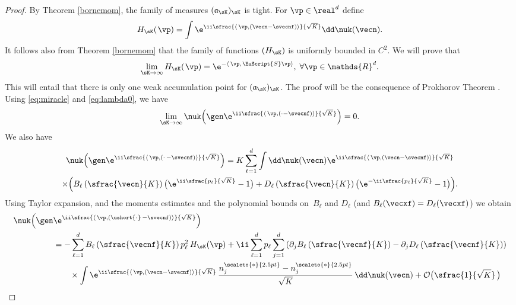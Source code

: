 \begin{proof}
By Theorem \ref{bornemom}, the family of measures $(\mathfrak{a}_{\sK})_{\sK}$ is tight.
For $\vp\in \real^d$ define
\[
H_{\sK}(\hspace{1pt}\vp)=\int \e^{\ii \sfrac{\langle\, \vp,(\vecn-\svecnf)\rangle}{\sqrt{K}}}\dd \nuk(\vecn).
\]
It follows also from Theorem \ref{bornemom} that the family of functions $(H_{\sK})$ is uniformly bounded in $C^{2}$.
We will prove that
\begin{equation}\label{pelouse}
\lim_{\sK\to\infty}H_{\sK}(\hspace{1pt}\vp)=\e^{-\langle\, \vp,\hspace{1pt}\EuScript{S}\vp\rangle},\;\forall \vp\in \mathds{R}^d.
\end{equation}
This will entail that there is only one weak accumulation point for $(\mathfrak{a}_{\sK})_{\sK}$.
The proof will be the consequence of Prokhorov Theorem \cite{patrick}.
Using \eqref{eq:miracle} and \eqref{eq:lambda0}, we have
\[
\lim_{\sK\to\infty}\nuk\!\left(\gen \e^{\ii\sfrac{\langle\, \vp,(\cdot-\svecnf)\rangle}{\sqrt{K}}}\right)=0.
\]
We also have
\begin{multline*}
\nuk\!\left(\gen \e^{\ii \sfrac{\langle\, \vp,(\cdot\,-\svecnf)\rangle}{\sqrt{K}}}\right)
=
K\sum_{\ell=1}^{d}\int\dd\nuk(\vecn)\e^{\ii\sfrac{\langle\, \vp,(\vecn-\svecnf)\rangle}{\sqrt{K}}} \\
\times \Bigl(B_{\ell}\left(\sfrac{\vecn}{K}\right) \bigl(\e^{\ii\sfrac{p_{\ell}}{\sqrt{K}}}-1 \bigr)
+ D_{\ell}\left(\sfrac{\vecn}{K}\right) \bigl(\e^{-\ii\sfrac{p_{\ell}}{\sqrt{K}}}-1 \bigr)\Bigr).
\end{multline*}
Using Taylor expansion, and the moments estimates and the polynomial bounds on~$B_{\ell}$ and $D_{\ell}$
(and $B_{\ell}(\vecxf)=D_{\ell}(\vecxf)$) we obtain
\begin{align*}
\nuk\Bigl(\gen& \e^{\ii\sfrac{\langle\, \vp,(\ushort{\cdot}\,-\svecnf)\rangle}{\sqrt{K}}}\Bigr)
\\
& =-\sum_{\ell=1}^{d}B_{\ell}\left(\sfrac{\vecnf}{K}\right) p_{\ell}^2\,H_{\sK}(\vp)+ \ii\sum_{\ell=1}^{d} p_{\ell}\sum_{j=1}^{d}
\left(\partial_{j}B_{\ell}\left(\sfrac{\vecnf}{K}\right)-\partial_{j}D_{\ell}\left(\sfrac{\vecnf}{K}\right)\right)\\
& \qquad \times \int \e^{\ii\sfrac{\langle\, \vp, (\vecn-\svecnf)\rangle}{\sqrt{K}}}\,
\frac{n_{j}^{\scaleto{*}{2.5pt}}-n_{j}^{\scaleto{*}{2.5pt}}}{\sqrt{K}}\, \dd\nuk(\vecn)
+\mathcal{O}\bigl(\sfrac{1}{\sqrt{K}}\,\bigr)\\

\end{align*}
\end{proof}
